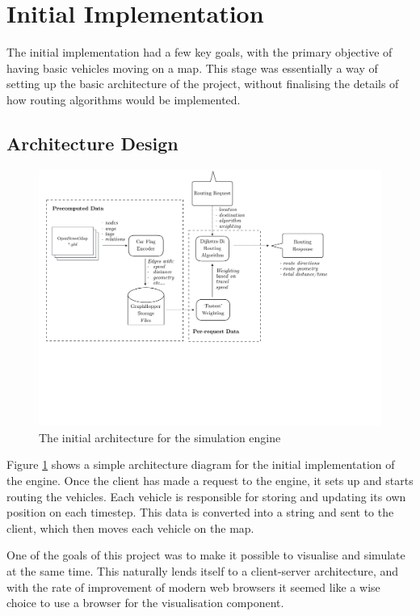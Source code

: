 \documentclass[ %
                    author={Alexander Hill},
                supervisor={Dr. Benjamin Sach},
                    degree={MEng},
                     title={MARMOSET},
                  subtitle={Multi-Agent Route Management using Online Simulation for Efficient Transportation},
                      type={research},
                      year={2016} ]{dissertation}
\begin{document}
\section{Initial Implementation}

The initial implementation had a few key goals, with the primary objective of
having basic vehicles moving on a map. This stage was essentially a way of
setting up the basic architecture of the project, without finalising the
details of how routing algorithms would be implemented.

\subsection{Architecture Design}

\begin{figure}[h]
    \centering
    \includegraphics[scale=0.5,page=2,clip,trim=0 17cm 3cm 0]{architecture}
    \caption{The initial architecture for the simulation engine}\label{fig:init-arch}
\end{figure}

Figure \ref{fig:init-arch} shows a simple architecture diagram for the initial
implementation of the engine. Once the client has made a request to the engine,
it sets up and starts routing the vehicles. Each vehicle is responsible for
storing and updating its own position on each timestep. This data is converted
into a string and sent to the client, which then moves each vehicle on the map.

One of the goals of this project was to make it possible to visualise and
simulate at the same time. This naturally lends itself to a client-server
architecture, and with the rate of improvement of modern web browsers it seemed
like a wise choice to use a browser for the visualisation component.
\end{document}
